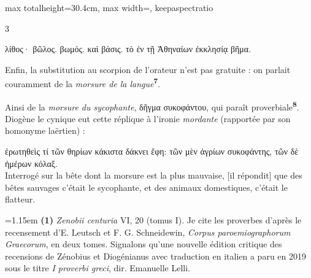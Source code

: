 \documentclass[11pt,twoside]{book}
\newcommand{\italique}[1]{\textit{#1}}
\newcommand{\citComm}[1]{\begin{quoting}[vskip=0.4pt,leftmargin=0.7em,rightmargin=0.2em]#1\end{quoting}}
\newcommand{\latin}[1]{\textit{#1}}
\newcommand{\marqueur}[1]{\textsuperscript{\color{rubricRed}\textbf{#1}}}
\begin{document}
\begin{adjustbox}{max totalheight=30.4cm, max width=\textwidth, keepaspectratio}
\begin{minipage}{\textwidth}
{\begin{multicols}{3}
\citComm{λίθος· βῶλος. βωμός. καὶ βάσις. τὸ ἐν τῇ Ἀθηναίων ἐκκλησίᾳ βῆμα.}
\par\vspace{1.5pt}
\noindent Enfin, la substitution au scorpion de l'orateur n'est pas gratuite : on parlait couramment de la \italique{morsure de la langue}\marqueur{7}.
\par\vspace{1.5pt}
\noindent Ainsi de la \italique{morsure du sycophante}, δῆγμα συκοφάντου, qui paraît proverbiale\marqueur{8}. Diogène le cynique eut cette réplique à l'ironie \italique{mordante} (rapportée par son homonyme laërtien) :
\citComm{ἐρωτηθεὶς τί τῶν θηρίων κάκιστα δάκνει ἔφη: τῶν μὲν ἀγρίων συκοφάντης, τῶν δὲ ἡμέρων κόλαξ.\\
Interrogé sur la bête dont la morsure est la plus mauvaise, [il répondit] que des bêtes sauvages c'était le sycophante, et des animaux domestiques, c'était le flatteur.}
\par\vspace{1.5pt}
\par\vspace{1.2pt}\par\nopagebreak\vspace{1pt}\noindent\hangindent=1.15em {\color{sepiaNote}\textbf{(1)}} \latin{Zenobii centuria} VI, 20 (tomus I). Je cite les proverbes d'après le recensement d'E. Leutsch et F. G. Schneidewin, \italique{Corpus paroemiographorum Graecorum}, en deux tomes. Signalons qu'une nouvelle édition critique des recensions de Zénobius et Diogénianus avec traduction en italien a paru en 2019 sous le titre \italique{I proverbi greci}, dir. Emanuelle Lelli.
\par\end{multicols}}
\end{minipage}\end{adjustbox}
\newpage
\end{document}
